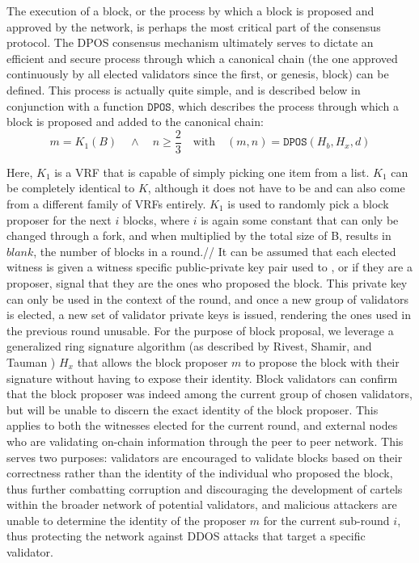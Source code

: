 \documentclass[conference]{IEEEtran}
\begin{document}
The execution of a block, or the process by which a block is proposed and approved by the network, is perhaps the most critical part of the consensus protocol. The DPOS consensus mechanism ultimately serves to dictate an efficient and secure process through which a canonical chain (the one approved continuously by all elected validators since the first, or genesis, block) can be defined. This process is actually quite simple, and is described below in conjunction with a function $\mathtt{DPOS}$, which describes the process through which a block is proposed and added to the canonical chain:
\begin{equation}
    m = {K_1(B)} \quad \wedge \quad n \ge \frac{2}{3} \quad
\text{with} \quad (m,n) = \mathtt{DPOS}(H_b,H_x,d) \end{equation}

Here, $K_1$ is a VRF that is capable of simply picking one item from a list. $K_1$ can be completely identical to $K$, although it does not have to be and can also come from a different family of VRFs entirely. $K_1$ is used to randomly pick a block proposer for the next $i$ blocks, where $i$ is again some constant that can only be changed through a fork, and when multiplied by the total size of B, results in $blank$, the number of blocks in a round.//
It can be assumed that each elected witness is given a witness specific public-private key pair used to , or if they are a proposer, signal that they are the ones who proposed the block. This private key can only be used in the context of the round, and once a new group of validators is elected, a new set of validator private keys is issued, rendering the ones used in the previous round unusable. For the purpose of block proposal, we leverage a generalized ring signature algorithm (as described by Rivest, Shamir, and Tauman \cite{Rivest2001}) $H_x$ that allows the block proposer $m$ to propose the block with their signature without having to expose their identity. Block validators can confirm that the block proposer was indeed among the current group of chosen validators, but will be unable to discern the exact identity of the block proposer. This applies to both the witnesses elected for the current round, and external nodes who are validating on-chain information through the peer to peer network. This serves two purposes: validators are encouraged to validate blocks based on their correctness rather than the identity of the individual who proposed the block, thus further combatting corruption and discouraging the development of cartels within the broader network of potential validators, and malicious attackers are unable to determine the identity of the proposer $m$ for the current sub-round $i$, thus protecting the network against DDOS attacks that target a specific validator. 
\end{document}
